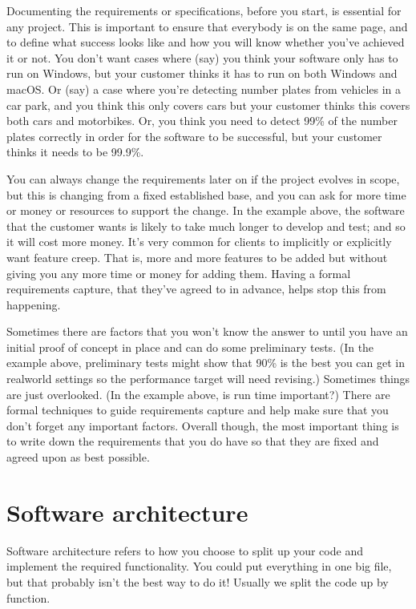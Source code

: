 \documentclass[letterpaper,10pt,british]{sphinxmanual}
\begin{document}
\sphinxAtStartPar
Documenting the requirements or specifications, before you start, is essential for any project. This is important to ensure that everybody is on the same page, and to define what success looks like and how you will know whether you’ve achieved it or not. You don’t want cases where (say) you think your software only has to run on Windows, but your customer thinks it has to run on both Windows and macOS. Or (say) a case where you’re detecting number plates from vehicles in a car park, and you think this only covers cars but your customer thinks this covers both cars and motorbikes. Or, you think you need to detect 99\% of the number plates correctly in order for the software to be successful, but your customer thinks it needs to be 99.9\%.

\sphinxAtStartPar
You can always change the requirements later on if the project evolves in scope, but this is changing from a fixed established base, and you can ask for more time or money or resources to support the change. In the example above, the software that the customer wants is likely to take much longer to develop and test; and so it will cost more money. It’s very common for clients to implicitly or explicitly want feature creep. That is, more and more features to be added but without giving you any more time or money for adding them. Having a formal requirements capture, that they’ve agreed to in advance, helps stop this from happening.

\sphinxAtStartPar
Sometimes there are factors that you won’t know the answer to until you have an initial proof of concept in place and can do some preliminary tests. (In the example above, preliminary tests might show that 90\% is the best you can get in real\sphinxhyphen{}world settings so the performance target will need revising.) Sometimes things are just overlooked. (In the example above, is run time important?) There are formal techniques to guide requirements capture and help make sure that you don’t forget any important factors. Overall though, the most important thing is to write down the requirements that you do have so that they are fixed and agreed upon as best possible.

\sphinxstepscope


\section{Software architecture}
\label{\detokenize{chapters/software_lifecycle/software_architecture:software-architecture}}\label{\detokenize{chapters/software_lifecycle/software_architecture:id1}}\label{\detokenize{chapters/software_lifecycle/software_architecture::doc}}
\sphinxAtStartPar
Software architecture refers to how you choose to split up your code and implement the required functionality. You could put everything in one big file, but that probably isn’t the best way to do it! Usually we split the code up by function.
\end{document}
